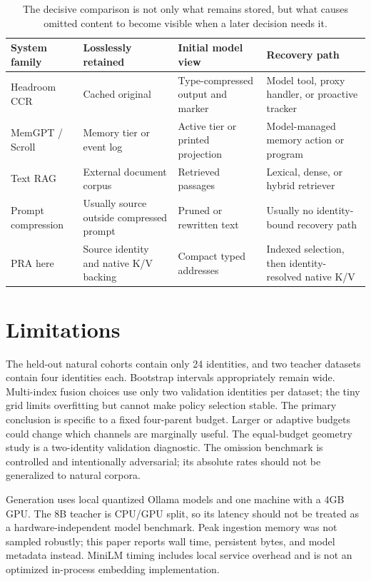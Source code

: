 \documentclass[11pt]{article}
\newcommand{\kv}{K/V\xspace}
\begin{document}
\begin{table}[t]
\centering
\small
\begin{tabularx}{\linewidth}{p{.17\linewidth}p{.21\linewidth}p{.23\linewidth}X}
\toprule
System family & Losslessly retained & Initial model view & Recovery path \\
\midrule
Headroom CCR & Cached original & Type-compressed output and marker & Model tool, proxy handler, or proactive tracker \\
MemGPT / Scroll & Memory tier or event log & Active tier or printed projection & Model-managed memory action or program \\
Text RAG & External document corpus & Retrieved passages & Lexical, dense, or hybrid retriever \\
Prompt compression & Usually source outside compressed prompt & Pruned or rewritten text & Usually no identity-bound recovery path \\
PRA here & Source identity and native \kv backing & Compact typed addresses & Indexed selection, then identity-resolved native \kv \\
\bottomrule
\end{tabularx}
\caption{The decisive comparison is not only what remains stored, but what
causes omitted content to become visible when a later decision needs it.}
\label{tab:related-taxonomy}
\end{table}

\section{Limitations}

The held-out natural cohorts contain only 24 identities, and two teacher
datasets contain four identities each. Bootstrap intervals appropriately remain
wide. Multi-index fusion choices use only two validation identities per
dataset; the tiny grid limits overfitting but cannot make policy selection
stable. The primary conclusion is specific to a fixed four-parent budget.
Larger or adaptive budgets could change which channels are marginally useful.
The equal-budget geometry study is a two-identity validation diagnostic. The
omission benchmark is controlled and intentionally adversarial; its absolute
rates should not be generalized to natural corpora.

Generation uses local quantized Ollama models and one machine with a 4GB GPU. The 8B teacher is CPU/GPU split, so its latency should not be treated as a hardware-independent model benchmark. Peak ingestion memory was not sampled robustly; this paper reports wall time, persistent bytes, and model metadata instead. MiniLM timing includes local service overhead and is not an optimized in-process embedding implementation.
\end{document}
